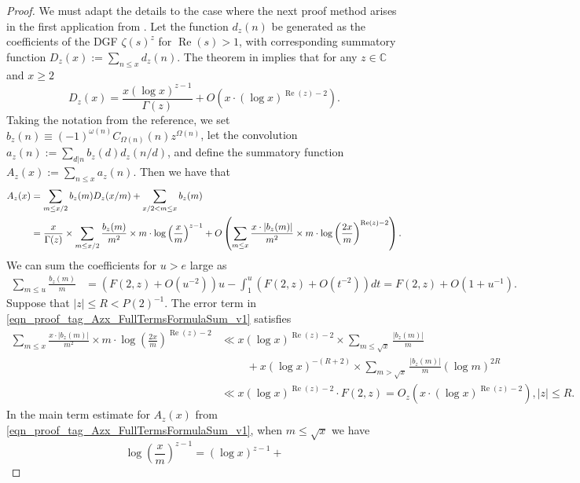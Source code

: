 \documentclass[11pt,reqno,a4letter]{article}
\numberwithin{figure}{section}
\numberwithin{table}{section}
\theoremstyle{plain}
\numberwithin{theorem}{section}
\theoremstyle{definition}
\renewcommand{\Re}{\operatorname{Re}}
\begin{document}
\begin{proof}
We must adapt the details to the case where the next proof method arises in the first 
application from \cite[\S 7.4; Thm.\ 7.18]{MV}. 
Let the function $d_z(n)$ be generated as the coefficients of the DGF 
$\zeta(s)^{z}$ for $\Re(s) > 1$, with corresponding 
summatory function $D_z(x) := \sum_{n \leq x} d_z(n)$. 
The theorem in \cite[Thm.\ 7.17; \S 7.4]{MV} implies that for any $z \in \mathbb{C}$ and $x \geq 2$ 
\[
D_z(x) = \frac{x (\log x)^{z-1}}{\Gamma(z)} + O\left(x \cdot (\log x)^{\Re(z)-2}\right). 
\]
Taking the notation from the reference, we set 
$b_z(n) \equiv (-1)^{\omega(n)} C_{\Omega(n)}(n) z^{\Omega(n)}$, let the convolution 
$a_z(n) := \sum_{d|n} b_z(d) d_z(n/d)$, and define the summatory function 
$A_z(x) := \sum_{n \leq x} a_z(n)$. 
Then we have that 
\begin{align} 
\notag 
A_z(x) & = \sum_{m \leq x/2} b_z(m) D_z(x/m) + \sum_{x/2 < m \leq x} b_z(m) \\ 
\label{eqn_proof_tag_Azx_FullTermsFormulaSum_v1} 
     & = \frac{x}{\Gamma(z)} \times \sum_{m \leq x/2} 
     \frac{b_z(m)}{m^2} \times m \cdot \log\left(\frac{x}{m}\right)^{z-1} + 
     O\left(\sum_{m \leq x} \frac{x \cdot |b_z(m)|}{m^2} \times m \cdot 
     \log\left(\frac{2x}{m}\right)^{\Re(z) - 2}\right). 
\end{align} 
We can sum the coefficients for $u > e$ large as 
\begin{align} 
\label{eqn_proof_tag_FsEQ2z_justification_formula} 
\sum_{m \leq u} \frac{b_z(m)}{m} & = (F(2, z) + O(u^{-2})) u - \int_1^{u} 
     (F(2, z) + O(t^{-2})) dt 
     = F(2, z) + O(1 + u^{-1}). 
\end{align} 
Suppose that $|z| \leq R < P(2)^{-1}$. 
The error term in \eqref{eqn_proof_tag_Azx_FullTermsFormulaSum_v1} satisfies 
\begin{align*} 
\sum_{m \leq x} \frac{x \cdot |b_z(m)|}{m^2} \times m \cdot 
     \log\left(\frac{2x}{m}\right)^{\Re(z) - 2} & \ll 
     x (\log x)^{\Re(z) - 2} \times \sum_{m \leq \sqrt{x}} \frac{|b_z(m)|}{m} \\ 
     & \phantom{\ll x\ } + 
     x (\log x)^{-(R+2)} \times \sum_{m > \sqrt{x}} \frac{|b_z(m)|}{m} (\log m)^{2R} \\ 
     & \ll x (\log x)^{\Re(z) - 2} \cdot F(2, z) 
     = O_z\left(x \cdot (\log x)^{\Re(z) - 2}\right), |z| \leq R. 
\end{align*} 
In the main term estimate for $A_z(x)$ from 
\eqref{eqn_proof_tag_Azx_FullTermsFormulaSum_v1}, when $m \leq \sqrt{x}$ we have 
\[
\log\left(\frac{x}{m}\right)^{z-1} = (\log x)^{z-1} + 
\]
\end{proof}
\end{document}
